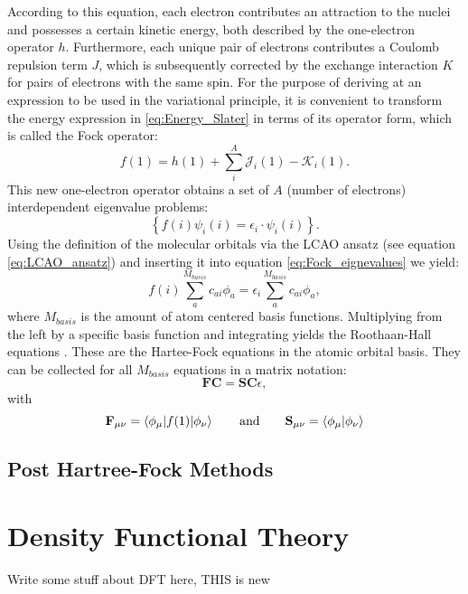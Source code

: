 According to this equation, each electron contributes an attraction to the nuclei and possesses a certain kinetic energy, both described by the one-electron operator $h$. Furthermore, each unique pair of electrons contributes a Coulomb repulsion term $J$, which is subsequently corrected by the exchange interaction $K$ for pairs of electrons with the same spin. For the purpose of deriving at an expression to be used in the variational principle, it is convenient to transform the energy expression in \ref{eq:Energy_Slater} in terms of its operator form, which is called the Fock operator:
\begin{equation}
    f(1) = h(1) + \sum_{i}^{A}\mathcal{J}_{i}(1)-\mathcal{K}_{i}(1).
    \label{eq:fock_operator}
\end{equation}
This new one-electron operator obtains a set of $A$ (number of electrons) interdependent eigenvalue problems: 
\begin{equation}
    \left\{
    f(i)\psi_{i}(i) = \epsilon_{i} \cdot \psi_{i}(i) \right\}.
    \label{eq:Fock_eignevalues}
\end{equation}
Using the definition of the molecular orbitals via the LCAO ansatz (see equation \ref{eq:LCAO_ansatz}) and inserting it into equation \ref{eq:Fock_eignevalues} we yield:
\begin{equation}
    f(i)\sum_{a}^{M_{basis}}c_{ai}\phi_{a} = \epsilon_{i}\sum_{a}^{M_{basis}}c_{ai}\phi_{a},
    \label{eq:Fock_eignevalues_plugged_in}
\end{equation}
where $M_{basis}$ is the amount of atom centered basis functions. Multiplying from the left by a specific basis function and integrating yields the Roothaan-Hall equations \cite{RevModPhys.23.69}. These are the Hartee-Fock equations in the atomic orbital basis. They can be collected for all $M_{basis}$ equations in a matrix notation:
\begin{equation}
    \textbf{FC} = \textbf{SC}\epsilon, 
    \label{eq:Hartree_fock_equation_matrix}
\end{equation}
with 
\begin{equation}
    \textbf{F}_{\mu\nu} = \braket{\phi_{\mu}|f(1)|\phi_{\nu}} \qquad \mathrm{and} \qquad \textbf{S}_{\mu\nu} = \braket{\phi_{\mu}|\phi_{\nu}}
    \label{eq:Fock_matrix}
\end{equation}
\subsection{Post Hartree-Fock Methods}
\label{sec:Post_Hartree-Fock_Methods}

\section{Density Functional Theory}
\label{sec:DFT}
Write some stuff about DFT here, THIS is new